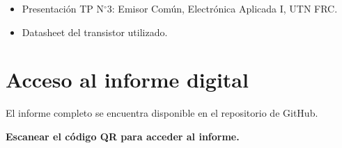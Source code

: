 \documentclass[a4paper,12pt]{article}
\begin{document}
\begin{itemize}
    
    \item Presentación TP N$^\circ$3: Emisor Común, Electrónica Aplicada I, UTN FRC.
    \item Datasheet del transistor utilizado.
\end{itemize}


\section*{Acceso al informe digital}

\begin{center}
	
	El informe completo se encuentra disponible en el repositorio de GitHub.\\[0.5cm]
	
	
	\vspace{0.4cm}
	
	\textbf{Escanear el código QR para acceder al informe.}
	
	\vspace{0.3cm}
	

	
\end{center}
\end{document}
